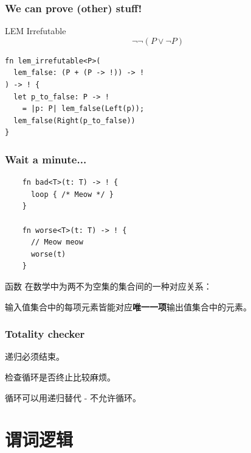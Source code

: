 \documentclass[UTF-8]{ctexbeamer}
\begin{document}
\begin{frame}[fragile]
  \frametitle{We can prove (other) stuff!}

  \begin{block}{LEM Irrefutable}
  $$
  \neg \neg (P \lor \neg P)
  $$
  \end{block}

  \pause
  \vspace{2em}

  \begin{verbatim}
fn lem_irrefutable<P>(
  lem_false: (P + (P -> !)) -> !
) -> ! {
  let p_to_false: P -> !
    = |p: P| lem_false(Left(p));
  lem_false(Right(p_to_false))
}
  \end{verbatim}
\end{frame}

\begin{frame}[fragile]
  \frametitle{Wait a minute...}

  \pause

  \begin{verbatim}
    fn bad<T>(t: T) -> ! {
      loop { /* Meow */ }
    }

    fn worse<T>(t: T) -> ! {
      // Meow meow
      worse(t)
    }
  \end{verbatim}

  \pause

  \vspace{1em}

  \begin{block}{函数}
    在数学中为两不为空集的集合间的一种对应关系：
    
    输入值集合中的每项元素皆能对应\textbf{唯一一项}输出值集合中的元素。
  \end{block}
\end{frame}

\begin{frame}
  \frametitle{Totality checker}

  递归必须结束。

  \pause

  \vspace{1em}

  检查循环是否终止比较麻烦。
  
  \pause
  
  循环可以用递归替代 - 不允许循环。
\end{frame}

\section{谓词逻辑}
\end{document}
